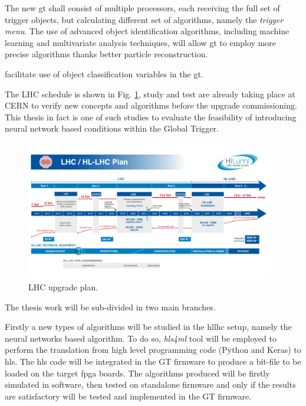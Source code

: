 \documentclass[../../main.tex]{subfiles}
\begin{document}
The new \acrshort{gt} shall consist of multiple processors, each receiving the full set of trigger objects, but calculating different set of algorithms, namely the \textit{trigger menu}. The use of advanced object identification algorithms, including machine learning and multivariate analysis techniques, will allow \acrshort{gt} to employ more precise algorithms thanks better particle reconstruction. 

facilitate use of object classification variables in the \acrshort{gt}.
    
The LHC schedule is shown in Fig. \ref{fig:lhc-plan}, study and test are already taking place at CERN to verify new concepts and algorithms before the upgrade commissioning. This thesis in fact is one of such studies to evaluate the feasibility of introducing neural network based conditions within the Global Trigger.
    
\begin{figure}[h]
    \centering
    \includegraphics[width=0.97\textwidth]{sections/01/Images/HL-LHC_Janvier2022.pdf}
    \caption{LHC upgrade plan.}
    \label{fig:lhc-plan}
\end{figure}
    
The thesis work will be sub-divided in two main branches.
    
Firstly a new types of algorithms will be studied in the \acrshort{hllhc} setup, namely the neural networks based algorithm. To do so, \textit{hls4ml} tool will be employed to perform the translation from high level programming code (Python and Keras) to \acrfull{hls}. The \acrshort{hls} code will be  integrated in the GT firmware to produce a bit-file to be loaded on the target \acrfull{fpga} boards. The algorithms produced will be firstly simulated in software, then tested on standalone firmware and only if the results are satisfactory will be tested and implemented in the GT firmware.
    
\end{document}
